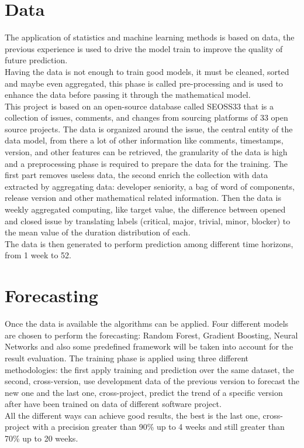 \documentclass{article}
\begin{document}
\section{Data}
The application of statistics and machine learning methods is based on data, the previous experience is used to drive the model train to improve the quality of future prediction.\\
Having the data is not enough to train good models, it must be cleaned, sorted and maybe even aggregated, this phase is called pre-processing and is used to enhance the data before passing it through the mathematical model.\\
This project is based on an open-source database called SEOSS33 that is a collection of issues, comments, and changes from sourcing platforms of 33 open source projects. The data is organized around the issue, the central entity of the data model, from there a lot of other information like comments, timestamps, version, and other features can be retrieved, the granularity of the data is high and a preprocessing phase is required to prepare the data for the training. The first part removes useless data, the second enrich the collection with data extracted by aggregating data: developer seniority, a bag of word of components, release version and other mathematical related information. Then the data is weekly aggregated computing, like target value, the difference between opened and closed issue by translating labels (critical, major, trivial, minor, blocker) to the mean value of the duration distribution of each.\\
The data is then generated to perform prediction among different time horizons, from 1 week to 52.

\section{Forecasting}
Once the data is available the algorithms can be applied. Four different models are chosen to perform the forecasting: Random Forest, Gradient Boosting, Neural Networks and also some predefined framework will be taken into account for the result evaluation. The training phase is applied using three different methodologies: the first apply training and prediction over the same dataset, the second, cross-version, use development data of the previous version to forecast the new one and the last one, cross-project, predict the trend of a specific version after have been trained on data of different software project.\\
All the different ways can achieve good results, the best is the last one, cross-project with a precision greater than 90\% up to 4 weeks and still greater than 70\% up to 20 weeks. 
\end{document}
